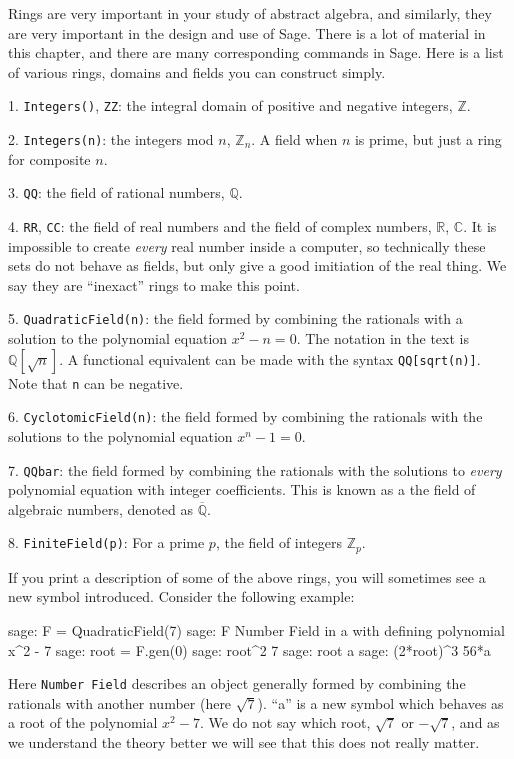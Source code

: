 Rings are very important in your study of abstract algebra, and similarly, they are very important in the design and use of Sage.  There is a lot of material in this chapter, and there are many corresponding commands in Sage.
%
%
Here is a list of various rings, domains and fields you can construct simply.\par
%
1. \verb?Integers()?, \verb?ZZ?: the integral domain of positive and negative integers, ${\mathbb Z}$.\par
%
2.  \verb?Integers(n)?: the integers mod $n$, ${\mathbb Z_n}$.  A field when $n$ is prime, but just a ring for composite $n$.\par
%
3.  \verb?QQ?: the field of rational numbers, ${\mathbb Q}$.\par
%
4.  \verb?RR?, \verb?CC?: the field of real numbers and the field of complex numbers, ${\mathbb R}$, ${\mathbb C}$.  It is impossible to create \emph{every} real number inside a computer, so technically these sets do not behave as fields, but only give a good imitiation of the real thing.  We say they are ``inexact'' rings to make this point.\par
%
5.  \verb?QuadraticField(n)?:  the field formed by combining the rationals with a solution to the polynomial equation $x^2-n=0$.  The notation in the text is ${\mathbb Q}[\sqrt{n}]$.  A functional equivalent can be made with the syntax \verb?QQ[sqrt(n)]?.  Note that \verb?n? can be negative.\par
%
6.  \verb?CyclotomicField(n)?: the field formed by combining the rationals with the solutions to the polynomial equation $x^n-1=0$.\par
%
7.  \verb?QQbar?: the field formed by combining the rationals with the solutions to \emph{every} polynomial equation with integer coefficients.  This is known as a the field of algebraic numbers, denoted as $\overline{{\mathbb Q}}$.\par
%
8.  \verb?FiniteField(p)?: For a prime $p$, the field of integers ${\mathbb Z_p}$.\par
%
If you print a description of some of the above rings, you will sometimes see a new symbol introduced.  Consider the following example:
%
\begin{sageexample}
sage: F = QuadraticField(7)
sage: F
Number Field in a with defining polynomial x^2 - 7
sage: root = F.gen(0)
sage: root^2
7
sage: root
a
sage: (2*root)^3
56*a
\end{sageexample}
%
Here \verb?Number Field? describes an object generally formed by combining the rationals with another number (here $\sqrt{7}$).  ``a'' is a new symbol which behaves as a root of the polynomial $x^2-7$.  We do not say which root, $\sqrt{7}$ or $-\sqrt{7}$, and as we understand the theory better we will see that this does not really matter.\par
